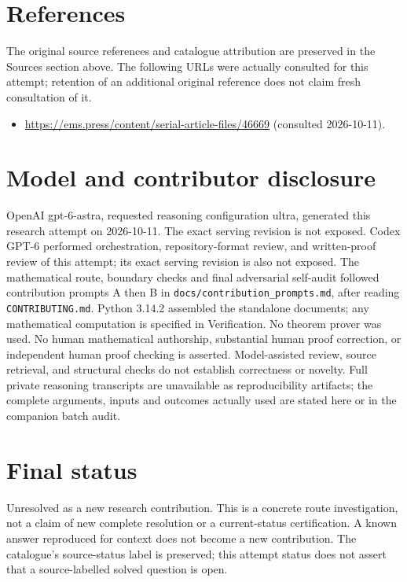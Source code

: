 \documentclass[11pt]{article}
\begin{document}
\section{References}
The original source references and catalogue attribution are preserved in the
Sources section above. The following URLs were actually consulted for this attempt;
retention of an additional original reference does not claim fresh consultation of it.
\begin{itemize}
\item \url{https://ems.press/content/serial-article-files/46669} (consulted 2026-10-11). 
\end{itemize}
\section{Model and contributor disclosure}
OpenAI gpt-6-astra, requested reasoning configuration ultra, generated this research
attempt on 2026-10-11. The exact serving revision is not exposed. Codex GPT-6
performed orchestration, repository-format review, and written-proof review of this attempt; its exact serving revision
is also not exposed. The mathematical route, boundary checks and final adversarial
self-audit followed contribution prompts A then B in
\texttt{docs/contribution\_prompts.md}, after reading \texttt{CONTRIBUTING.md}.
Python 3.14.2 assembled the standalone documents; any mathematical computation is
specified in Verification. No theorem prover was used. No human mathematical
authorship, substantial human proof correction, or independent human proof checking
is asserted. Model-assisted review, source retrieval, and structural checks do not
establish correctness or novelty. Full private reasoning transcripts are unavailable
as reproducibility artifacts; the complete arguments, inputs and outcomes actually
used are stated here or in the companion batch audit.
\section{Final status}
Unresolved as a new research contribution. This is a concrete route investigation,
not a claim of new complete resolution or a current-status certification. A known
answer reproduced for context does not become a new contribution. The catalogue's
source-status label is preserved; this attempt status does not assert that a
source-labelled solved question is open.
\end{document}
